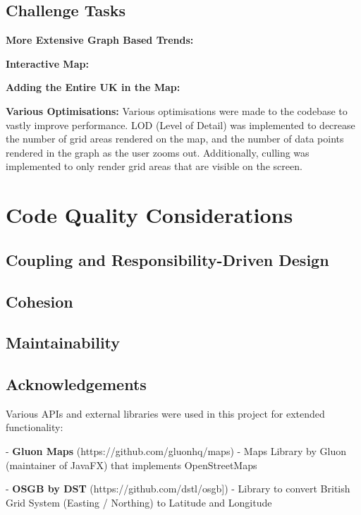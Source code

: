 \documentclass[10pt, a4paper]{scrartcl}
\begin{document}
\begin{multicols}{2}
        \subsection{Challenge Tasks}

        \noindent \textbf{More Extensive Graph Based Trends:}

        \noindent \textbf{Interactive Map:}

        \noindent \textbf{Adding the Entire UK in the Map:}

        \noindent \textbf{Various Optimisations:} Various optimisations were made to the codebase to vastly improve performance.
        LOD (Level of Detail) was implemented to decrease the number of grid areas rendered on the map, and the number of data points
        rendered in the graph as the user zooms out. Additionally, culling was implemented to only render grid areas that are visible
        on the screen.
       
        \section{Code Quality Considerations}

        \subsection{Coupling and Responsibility-Driven Design}
      
        \subsection{Cohesion}
        
        \subsection{Maintainability}

        \subsection{Acknowledgements}
        \noindent Various APIs and external libraries were used in this project for extended functionality:

        - \textbf{Gluon Maps} (https://github.com/gluonhq/maps) - Maps Library by Gluon (maintainer of JavaFX) that implements OpenStreetMaps

        - \textbf{OSGB by DST} (https://github.com/dstl/osgb]) - Library to convert British Grid System (Easting / Northing) to Latitude and Longitude


\end{multicols}
\end{document}
